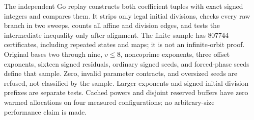 \documentclass[11pt,letterpaper]{article}
\begin{document}
The independent Go replay constructs both coefficient tuples with exact
signed integers and compares them. It strips only legal initial divisions,
checks every raw branch in two sweeps, counts all affine and division edges,
and tests the intermediate inequality only after alignment.
The finite sample has 807744 certificates, including repeated states and maps;
it is not an infinite-orbit proof. Original bases two through nine,
\(v\le8\), noncoprime exponents, three offset exponents, sixteen signed
residuals, ordinary signed seeds, and forced-phase seeds define that sample.
Zero, invalid parameter contracts, and oversized seeds are refused, not
classified by the sample. Larger exponents and signed initial division
prefixes are separate tests. Cached powers and disjoint reserved buffers have
zero warmed allocations on four measured configurations; no arbitrary-size
performance claim is made.



\end{document}
